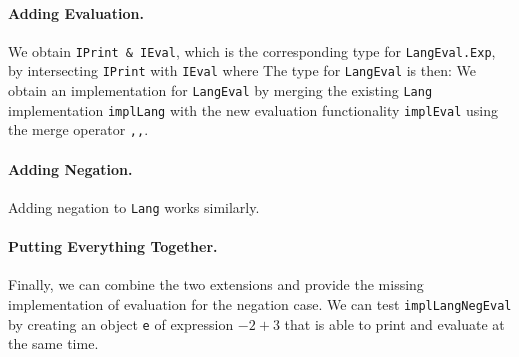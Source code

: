 \paragraph{Adding Evaluation.}
We obtain \lstinline{IPrint & IEval}, which is the corresponding type for \lstinline{LangEval.Exp}, by
intersecting \lstinline{IPrint} with \lstinline{IEval} where
The type for \lstinline{LangEval} is then:
We obtain an implementation for \lstinline{LangEval} by merging the existing
\lstinline{Lang} implementation \lstinline{implLang} with the new evaluation
functionality \lstinline{implEval} using the merge operator \lstinline{,,}.

\paragraph{Adding Negation.}
Adding negation to \lstinline{Lang} works similarly.



\paragraph{Putting Everything Together.}
Finally, we can combine the two extensions and provide the missing
implementation of evaluation for the negation case.
We can test \lstinline{implLangNegEval} by creating an object \lstinline{e} of expression $-2 + 3$ that is able to print and evaluate at the same time.



